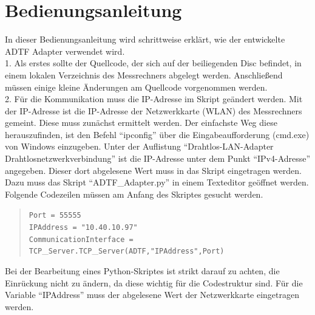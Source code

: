 \documentclass[12pt,a4paper]{report}
\begin{document}
\section{Bedienungsanleitung}
In dieser Bedienungsanleitung wird schrittweise erklärt, wie der entwickelte ADTF Adapter verwendet wird.
\\[0.5cm]
1. Als erstes sollte der Quellcode, der sich auf der beiliegenden Disc befindet, in einem lokalen Verzeichnis des Messrechners abgelegt werden. Anschlie\ss end müssen einige kleine Änderungen am Quellcode vorgenommen werden.
\\[0.5cm]
2. Für die Kommunikation muss die IP-Adresse im Skript geändert werden. Mit der IP-Adresse ist die IP-Adresse der Netzwerkkarte (WLAN) des Messrechners gemeint. Diese muss zunächst ermittelt werden. Der einfachste Weg diese herauszufinden, ist den Befehl "`ipconfig"' über die Eingabeaufforderung (cmd.exe) von Windows einzugeben. Unter der Auflistung "`Drahtlos-LAN-Adapter Drahtlosnetzwerkverbindung"' ist die IP-Adresse unter dem Punkt "`IPv4-Adresse"' angegeben. Dieser dort abgelesene Wert muss in das Skript eingetragen werden. Dazu muss das Skript "`ADTF\_Adapter.py"' in einem Texteditor geöffnet werden. Folgende Codezeilen müssen am Anfang des Skriptes gesucht werden. 
\begin{quote}
\verb|Port = 55555|\\
\verb|IPAddress = "10.40.10.97"|\\
\verb|CommunicationInterface = TCP|\_\verb|Server.TCP|\_\verb|Server(ADTF,"IPAddress",Port)|\\
\end{quote}
Bei der Bearbeitung eines Python-Skriptes ist strikt darauf zu achten, die Einrückung nicht zu ändern, da diese wichtig für die Codestruktur sind. Für die Variable "`IPAddress"' muss der abgelesene Wert der Netzwerkkarte eingetragen werden.
\end{document}
